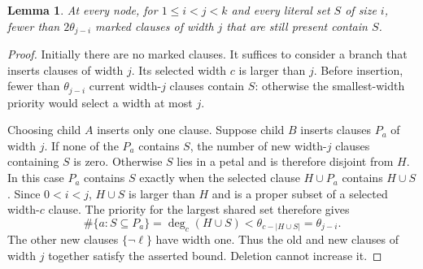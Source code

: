 \documentclass[11pt,reqno]{amsart}
\numberwithin{equation}{section}
\newtheorem{lemma}[theorem]{Lemma}
\theoremstyle{definition}\newtheorem{definition}[theorem]{Definition}
\theoremstyle{remark}\newtheorem{remark}[theorem]{Remark}
\renewcommand{\le}{\leqslant}
\begin{document}
\begin{lemma}\label{lem:spar-marked-degree}
At every node, for $1\le i<j<k$ and every literal set $S$ of size $i$,
fewer than $2\theta_{j-i}$ marked clauses of width $j$ that are
still present contain $S$.
\end{lemma}
\begin{proof}
Initially there are no marked clauses. It suffices to consider a branch
that inserts clauses of width $j$. Its selected width $c$ is larger than
$j$. Before insertion, fewer than $\theta_{j-i}$ current width-$j$
clauses contain $S$: otherwise the smallest-width priority would select
a width at most $j$.

Choosing child $A$ inserts only one clause.
Suppose child $B$ inserts clauses $P_a$ of width $j$.
If none of the $P_a$ contains $S$, the number of new width-$j$ clauses
containing $S$ is zero. Otherwise $S$ lies in a petal and is therefore
disjoint from $H$. In this case $P_a$ contains $S$ exactly when the
selected clause $H\cup P_a$ contains $H\cup S$. Since $0<i<j$,
$H\cup S$ is larger than $H$ and is a proper subset of a selected
width-$c$ clause.
The priority for the largest shared set therefore gives
\[
 \#\{a:S\subseteq P_a\}
 =\deg_c(H\cup S)<\theta_{c-|H\cup S|}
 =\theta_{j-i}.
\]
The other new clauses $\{\neg\ell\}$ have width one.
Thus the old and new clauses of width $j$ together satisfy the
asserted bound. Deletion cannot increase it.
\end{proof}
\end{document}
